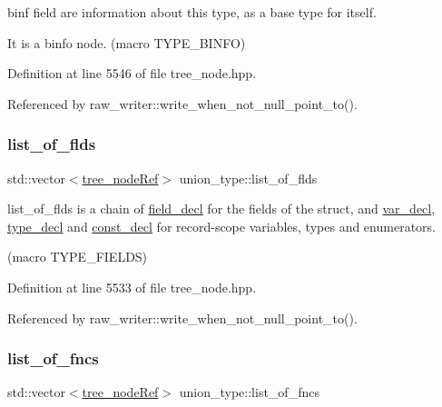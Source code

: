 binf field are information about this type, as a base type for itself. 

It is a binfo node. (macro T\+Y\+P\+E\+\_\+\+B\+I\+N\+FO) 

Definition at line 5546 of file tree\+\_\+node.\+hpp.



Referenced by raw\+\_\+writer\+::write\+\_\+when\+\_\+not\+\_\+null\+\_\+point\+\_\+to().

\mbox{\label{structunion__type_afc9fabf0aa1ebfbcf0a4d10b7c5c61f0}} 
\subsubsection{\texorpdfstring{list\+\_\+of\+\_\+flds}{list\_of\_flds}}
{\footnotesize\ttfamily std\+::vector$<$\hyperlink{tree__node_8hpp_a6ee377554d1c4871ad66a337eaa67fd5}{tree\+\_\+node\+Ref}$>$ union\+\_\+type\+::list\+\_\+of\+\_\+flds}



list\+\_\+of\+\_\+flds is a chain of \hyperlink{structfield__decl}{field\+\_\+decl} for the fields of the struct, and \hyperlink{structvar__decl}{var\+\_\+decl}, \hyperlink{structtype__decl}{type\+\_\+decl} and \hyperlink{structconst__decl}{const\+\_\+decl} for record-\/scope variables, types and enumerators. 

(macro T\+Y\+P\+E\+\_\+\+F\+I\+E\+L\+DS) 

Definition at line 5533 of file tree\+\_\+node.\+hpp.



Referenced by raw\+\_\+writer\+::write\+\_\+when\+\_\+not\+\_\+null\+\_\+point\+\_\+to().

\mbox{\label{structunion__type_a9e6fa58f4f221b7eca938388a638e14b}} 
\subsubsection{\texorpdfstring{list\+\_\+of\+\_\+fncs}{list\_of\_fncs}}
{\footnotesize\ttfamily std\+::vector$<$\hyperlink{tree__node_8hpp_a6ee377554d1c4871ad66a337eaa67fd5}{tree\+\_\+node\+Ref}$>$ union\+\_\+type\+::list\+\_\+of\+\_\+fncs}



